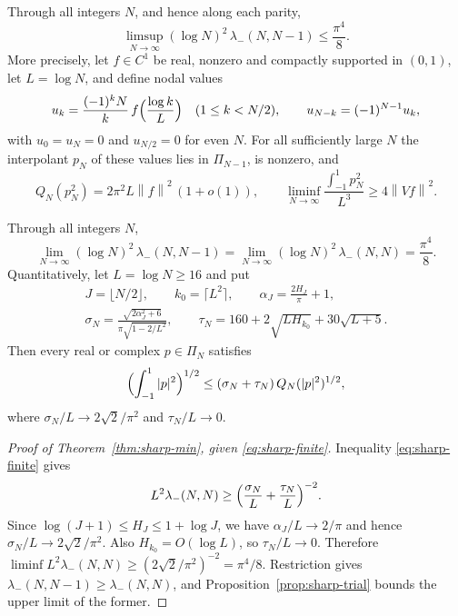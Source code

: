 \documentclass{siamart251216}
\newcommand{\Pn}{\Pi}
\newcommand{\norm}[1]{\left\lVert#1\right\rVert}
\begin{document}
\begin{proposition}\label{prop:sharp-trial}%
Through all integers $N$, and hence along each parity,
\[
 \limsup_{N\to\infty}(\log N)^2\,\lambda_-(N,N-1)\le\frac{\pi^4}8 .
\]
More precisely, let $f\in C^1$ be real, nonzero and compactly supported in
$(0,1)$, let $L=\log N$, and define nodal values
\[
 u_k=\frac{(-1)^kN}{k}\,f\Bigl(\frac{\log k}L\Bigr)\quad(1\le k<N/2),\qquad
 u_{N-k}=(-1)^{N-1}u_k,
\]
with $u_0=u_N=0$ and $u_{N/2}=0$ for even $N$. For all sufficiently
large $N$ the interpolant $p_N$ of these values lies in $\Pn_{N-1}$, is
nonzero, and
\[
 Q_N(p_N^2)=2\pi^2L\norm f^2\,(1+o(1)),\qquad
 \liminf_{N\to\infty}\frac{\int_{-1}^1p_N^2}{L^3}\ge4\norm{Vf}^2 .
\]
\end{proposition}

\begin{theorem}\label{thm:sharp-min}%
Through all integers $N$,
\[
 \lim_{N\to\infty}(\log N)^2\,\lambda_-(N,N-1)
 =\lim_{N\to\infty}(\log N)^2\,\lambda_-(N,N)=\frac{\pi^4}8 .
\]
Quantitatively, let $L=\log N\ge16$ and put
\[
\begin{gathered}
 J=\lfloor N/2\rfloor,\qquad k_0=\lceil L^2\rceil,\qquad
 \alpha_J=\frac{2H_J}\pi+1,\\
 \sigma_N=\frac{\sqrt{2\alpha_J^2+6}}{\pi\sqrt{1-2/L^2}},\qquad
 \tau_N=160+2\sqrt{LH_{k_0}}+30\sqrt{L+5}.
\end{gathered}
\]
Then every real or complex $p\in\Pn_N$ satisfies
\begin{equation}\label{eq:sharp-finite}
 \Bigl(\int_{-1}^1|p|^2\Bigr)^{1/2}\le(\sigma_N+\tau_N)\,
 Q_N(|p|^2)^{1/2},
\end{equation}
where $\sigma_N/L\to2\sqrt2/\pi^2$ and $\tau_N/L\to0$.
\end{theorem}

\begin{proof}[Proof of Theorem~\ref{thm:sharp-min}, given \eqref{eq:sharp-finite}]
Inequality \eqref{eq:sharp-finite} gives
\[
 L^2\lambda_-(N,N)\ge\Bigl(\frac{\sigma_N}L+\frac{\tau_N}L\Bigr)^{-2}.
\]
Since $\log(J+1)\le H_J\le1+\log J$, we have $\alpha_J/L\to2/\pi$ and
hence $\sigma_N/L\to2\sqrt2/\pi^2$. Also $H_{k_0}=O(\log L)$, so
$\tau_N/L\to0$. Therefore
$\liminf L^2\lambda_-(N,N)\ge(2\sqrt2/\pi^2)^{-2}=\pi^4/8$.
Restriction gives $\lambda_-(N,N-1)\ge\lambda_-(N,N)$, and
Proposition~\ref{prop:sharp-trial} bounds the upper limit of the former.
\end{proof}
\end{document}
